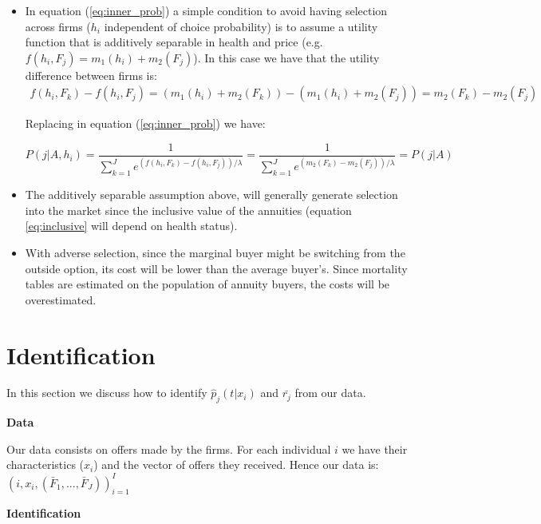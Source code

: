\documentclass[12pt]{article}
\theoremstyle{plain}
\theoremstyle{plain}
\begin{document}
\begin{itemize}
    \item In equation (\ref{eq:inner_prob}) a simple condition to avoid having selection across firms ($h_i$ independent of choice probability) is to assume a utility function that is additively separable in health and price (e.g. $f(h_i, F_j) = m_1(h_i) + m_2(F_j)$). In this case we have that the utility difference between firms is: 
    \begin{align*}
    f(h_i, F_k) - f(h_i, F_j) = ( m_1(h_i) + m_2(F_k)) - ( m_1(h_i) + m_2(F_j)) = m_2(F_k) - m_2(F_j)
    \end{align*}

    Replacing in equation (\ref{eq:inner_prob}) we have: 
    
    \begin{equation}\label{eq:inner_prob2}
    P(j|A, h_i) = \frac{1}{\sum_{k=1}^{J} e^{(f(h_i, F_k)-f(h_i, F_j)) / \lambda}} =  \frac{1}{\sum_{k=1}^{J} e^{(m_2(F_k) - m_2(F_j)) / \lambda}} = P(j|A)
    \end{equation}

    \item The additively separable assumption above, will generally generate selection into the market since the inclusive value of the annuities (equation \ref{eq:inclusive} will depend on health status). 

    \item With adverse selection, since the marginal buyer might be switching from the outside option, its cost will be lower than the average buyer's. Since   mortality tables are estimated on the population of annuity buyers, the costs will be overestimated.  
\end{itemize}


\section{Identification}\label{sec:identification}


In this section we discuss how to identify $\hat{p}_{j}(t|x_{i})$  and  $\bar{r_{j}}$ from our data. 


\textbf{Data}

Our data consists on offers made by the firms. For each individual $i$ we have their characteristics ($x_i$) and the vector of offers they received. Hence our data is:  $(i, x_i, (\bar{F}_1, ..., \bar{F}_J))_{i=1}^I$ 

 

\textbf{Identification}
\end{document}
